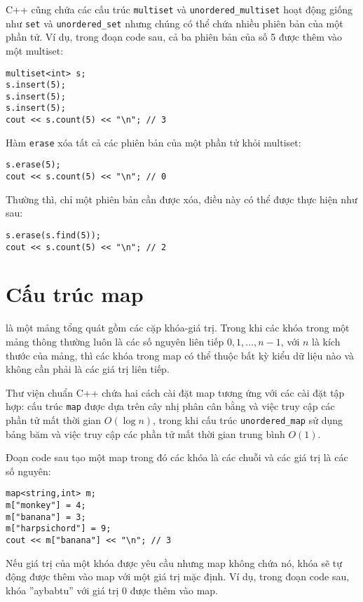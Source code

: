 C++ cũng chứa các cấu trúc
\texttt{multiset} và \texttt{unordered\_multiset}
hoạt động giống như \texttt{set}
và \texttt{unordered\_set}
nhưng chúng có thể chứa nhiều phiên bản của một phần tử.
Ví dụ, trong đoạn code sau, cả ba phiên bản
của số 5 được thêm vào một multiset:

\begin{lstlisting}
multiset<int> s;
s.insert(5);
s.insert(5);
s.insert(5);
cout << s.count(5) << "\n"; // 3
\end{lstlisting}
Hàm \texttt{erase} xóa
tất cả các phiên bản của một phần tử
khỏi multiset:
\begin{lstlisting}
s.erase(5);
cout << s.count(5) << "\n"; // 0
\end{lstlisting}
Thường thì, chỉ một phiên bản cần được xóa,
điều này có thể được thực hiện như sau:
\begin{lstlisting}
s.erase(s.find(5));
cout << s.count(5) << "\n"; // 2
\end{lstlisting}

\section{Cấu trúc map}


 là một mảng tổng quát
gồm các cặp khóa-giá trị.
Trong khi các khóa trong một mảng thông thường luôn là
các số nguyên liên tiếp $0,1,\ldots,n-1$,
với $n$ là kích thước của mảng,
thì các khóa trong map có thể thuộc bất kỳ kiểu dữ liệu nào và
không cần phải là các giá trị liên tiếp.

Thư viện chuẩn C++ chứa hai cách cài đặt map
tương ứng với các cài đặt tập hợp:
cấu trúc \texttt{map} được dựa trên cây
nhị phân cân bằng và việc truy cập các phần tử
mất thời gian $O(\log n)$,
trong khi cấu trúc \texttt{unordered\_map}
sử dụng bảng băm và việc truy cập các phần tử
mất thời gian trung bình $O(1)$.

Đoạn code sau tạo một map
trong đó các khóa là các chuỗi và các giá trị là các số nguyên:

\begin{lstlisting}
map<string,int> m;
m["monkey"] = 4;
m["banana"] = 3;
m["harpsichord"] = 9;
cout << m["banana"] << "\n"; // 3
\end{lstlisting}

Nếu giá trị của một khóa được yêu cầu
nhưng map không chứa nó,
khóa sẽ tự động được thêm vào map với
một giá trị mặc định.
Ví dụ, trong đoạn code sau,
khóa ''aybabtu'' với giá trị 0
được thêm vào map.


